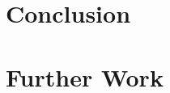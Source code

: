 \documentclass[a4paper]{report}
\begin{document}
\chapter{Conclusion}

\chapter{Further Work}


\nocite{*}


\clearpage



\end{document}
